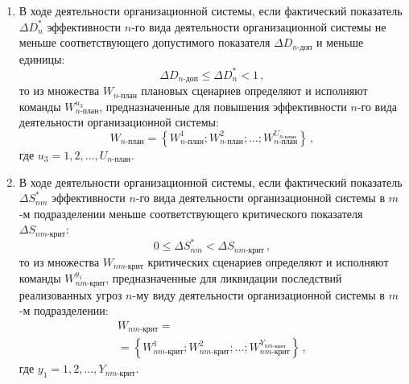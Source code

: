 \begin{multicols}{2}
\begin{enumerate}[1.]
\item В ходе деятельности организационной сис\-те\-мы, если фактический показатель
$\Delta D^*_n$ эффективности $n$-го вида деятельности организационной системы не
меньше соответствующего допустимого показателя $\Delta D_{n\mbox{-}\mathrm{доп}}$ и
меньше единицы:
\begin{equation*}
      \Delta D_{n\mbox{-}\mathrm{доп}}\leq  \Delta D_n^* < 1\,,
      \end{equation*}
      то из множества $W_{n\mbox{-}\mathrm{план}}$ плановых
сценариев определяют и исполняют команды
      $W^{u_3}_{n\mbox{-}\mathrm{план}}$, предназначенные для
повышения эф\-фек\-тив\-ности $n$-го вида деятельности
организационной сис\-темы:
      \begin{equation*}
     W_{n\mbox{-}\mathrm{план}} = \left\{ W_{n\mbox{-}\mathrm{план}}^1;
     W_{n\mbox{-}\mathrm{план}}^2; \ldots  ;
     W^{U_{n\mbox{-}\mathrm{план}}}_{n\mbox{-}\mathrm{план}}\right\}\,,
     \end{equation*}
     где $u_3 = 1, 2, \ldots , U_{n\mbox{-}\mathrm{план}}$.\\[-15pt]

\item В ходе деятельности организационной сис\-те\-мы, если фактический показатель
$\Delta S^*_{nm}$ эффективности $n$-го вида деятельности организационной системы в
$m$-м подразделении \mbox{меньше} соответствующего критического показателя $\Delta
S_{nm\mbox{-}\mathrm{крит}}$:
\begin{equation*}
     0 \leq \Delta S^*_{nm}< \Delta S_{nm\mbox{-}\mathrm{крит}}\,,
     \end{equation*}
     то из множества $W_{nm\mbox{-}\mathrm{крит}}$ критических
сценариев определяют и исполняют команды
     $W^{y_1}_{nm\mbox{-}\mathrm{крит}}$, предназначенные для
ликвидации последствий реализованных угроз $n$-му виду
деятельности организационной системы в \mbox{$m$-м}
подразделении:
     \begin{multline*}
     W_{nm\mbox{-}\mathrm{крит}} ={}\\
     {}= \left\{W^1_{nm\mbox{-}\mathrm{крит}};
     W^2_{nm\mbox{-}\mathrm{крит}}; \ldots ;
     W^{Y_{nm\mbox{-}\mathrm{крит}}}_{nm\mbox{-}\mathrm{крит}}\right\}\,,
     \end{multline*}
     где $y_1 = 1, 2, \ldots , Y_{nm\mbox{-}\mathrm{крит}}$.\\[-15pt]


\end{enumerate}
\end{multicols}
